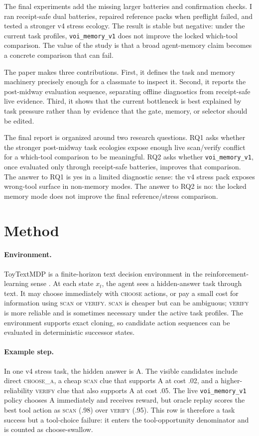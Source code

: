 \documentclass[11pt]{article}
\begin{document}
The final experiments add the missing larger batteries and confirmation checks. I ran receipt-safe dual batteries, repaired reference packs when preflight failed, and tested a stronger v4 stress ecology. The result is stable but negative: under the current task profiles, \texttt{voi\_memory\_v1} does not improve the locked which-tool comparison. The value of the study is that a broad agent-memory claim becomes a concrete comparison that can fail.

The paper makes three contributions. First, it defines the task and memory machinery precisely enough for a classmate to inspect it. Second, it reports the post-midway evaluation sequence, separating offline diagnostics from receipt-safe live evidence. Third, it shows that the current bottleneck is best explained by task pressure rather than by evidence that the gate, memory, or selector should be edited.

The final report is organized around two research questions. RQ1 asks whether the stronger post-midway task ecologies expose enough live scan/verify conflict for a which-tool comparison to be meaningful. RQ2 asks whether \texttt{voi\_memory\_v1}, once evaluated only through receipt-safe batteries, improves that comparison. The answer to RQ1 is yes in a limited diagnostic sense: the v4 stress pack exposes wrong-tool surface in non-memory modes. The answer to RQ2 is no: the locked memory mode does not improve the final reference/stress comparison.

\section{Method}

\paragraph{Environment.}
ToyTextMDP is a finite-horizon text decision environment in the reinforcement-learning sense \citep{sutton2018reinforcement}. At each state $x_t$, the agent sees a hidden-answer task through text. It may choose immediately with \textsc{choose} actions, or pay a small cost for information using \textsc{scan} or \textsc{verify}. \textsc{scan} is cheaper but can be ambiguous; \textsc{verify} is more reliable and is sometimes necessary under the active task profiles. The environment supports exact cloning, so candidate action sequences can be evaluated in deterministic successor states.

\paragraph{Example step.}
In one v4 stress task, the hidden answer is A. The visible candidates include direct \textsc{choose\_a}, a cheap \textsc{scan} clue that supports A at cost .02, and a higher-reliability \textsc{verify} clue that also supports A at cost .05. The live \texttt{voi\_memory\_v1} policy chooses A immediately and receives reward, but oracle replay scores the best tool action as \textsc{scan} (.98) over \textsc{verify} (.95). This row is therefore a task success but a tool-choice failure: it enters the tool-opportunity denominator and is counted as choose-swallow.
\end{document}
